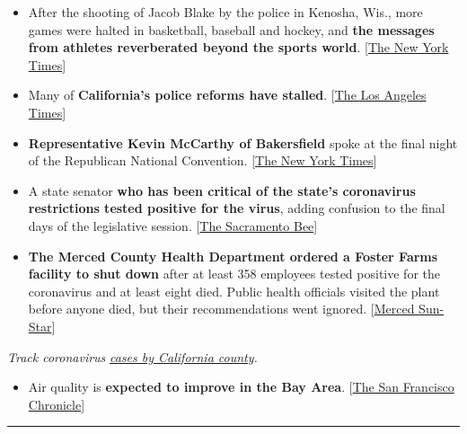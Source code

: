 \begin{itemize}
\item
  After the shooting of Jacob Blake by the police in Kenosha, Wis., more
  games were halted in basketball, baseball and hockey, and \textbf{the
  messages from athletes reverberated beyond the sports world}.
  {[}\href{https://www.nytimes3xbfgragh.onion/2020/08/27/sports/basketball/nba-resume.html?}{The
  New York Times}{]}
\item
  Many of \textbf{California's police reforms have stalled}.
  {[}\href{https://www.latimes.com/california/story/2020-08-27/police-reform-george-floyd-california-legislature}{The
  Los Angeles Times}{]}
\item
  \textbf{Representative Kevin McCarthy of Bakersfield} spoke at the
  final night of the Republican National Convention.
  {[}\href{https://www.nytimes3xbfgragh.onion/live/2020/08/27/us/rnc-convention-election/kevin-mccarthy-rehashes-many-of-the-conventions-biggest-catchphrases-in-his-speech}{The
  New York Times}{]}
\item
  A state senator \textbf{who has been critical of the state's
  coronavirus restrictions tested positive for the virus}, adding
  confusion to the final days of the legislative session.
  {[}\href{https://www.sacbee.com/news/politics-government/capitol-alert/article245287135.html}{The
  Sacramento Bee}{]}
\item
  \textbf{The Merced County Health Department ordered a Foster Farms
  facility to shut down} after at least 358 employees tested positive
  for the coronavirus and at least eight died. Public health officials
  visited the plant before anyone died, but their recommendations went
  ignored.
  {[}\href{https://www.mercedsunstar.com/news/coronavirus/article245313960.html}{Merced
  Sun-Star}{]}
\end{itemize}

\emph{Track coronavirus}
\href{https://www.nytimes3xbfgragh.onion/interactive/2020/us/california-coronavirus-cases.html}{\emph{cases
by California county}}\emph{.}

\begin{itemize}
\tightlist
\item
  Air quality is \textbf{expected to improve in the Bay Area}.
  {[}\href{https://www.sfchronicle.com/california-wildfires/article/Will-smoke-return-More-storms-on-the-way-15520011.php}{The
  San Francisco Chronicle}{]}
\end{itemize}

\begin{center}\rule{0.5\linewidth}{\linethickness}\end{center}

